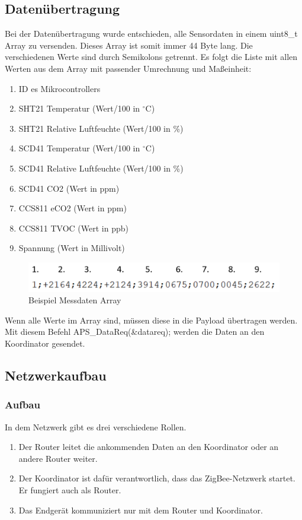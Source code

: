 \documentclass[]{article}
\begin{document}
			\subsection{Datenübertragung}
			Bei der Datenübertragung wurde entschieden, alle Sensordaten in einem uint8\_t Array zu versenden. Dieses Array ist somit immer 44 Byte lang. Die verschiedenen Werte sind durch Semikolons getrennt. Es folgt die Liste mit allen Werten aus dem Array mit passender Umrechnung und Maßeinheit:
			\begin{enumerate}
				\item ID es Mikrocontrollers		
				\item SHT21 Temperatur				(Wert/100 in $^\circ$C)
				\item SHT21 Relative Luftfeuchte	(Wert/100 in \%)
				\item SCD41 Temperatur				(Wert/100 in $^\circ$C)
				\item SCD41 Relative Luftfeuchte	(Wert/100 in \%)
				\item SCD41 CO2						(Wert in ppm)
				\item CCS811 eCO2					(Wert in ppm)
				\item CCS811 TVOC					(Wert in ppb)
				\item Spannung 						(Wert in Millivolt)
			\end{enumerate}
			\begin{figure}[!h]
				\centering
				\includegraphics[scale=0.60]{images/data_example}
				\caption{Beispiel Messdaten Array}
				\label{img:data_example}
			\end{figure}
			
			
			Wenn alle Werte im Array sind, müssen diese in die Payload übertragen werden. Mit diesem Befehl APS\_DataReq(\&datareq); werden die Daten an den Koordinator gesendet.
			
			\subsection{Netzwerkaufbau}
			\subsubsection{Aufbau}
			In dem Netzwerk gibt es drei verschiedene Rollen. 
			
			\begin{enumerate}
				\item Der Router leitet die ankommenden Daten an den Koordinator oder an andere Router weiter. 
				\item Der Koordinator ist dafür verantwortlich, dass das ZigBee-Netzwerk startet. Er fungiert auch als Router.
				\item Das Endgerät kommuniziert nur mit dem Router und Koordinator. 
			\end{enumerate}
			
\end{document}
